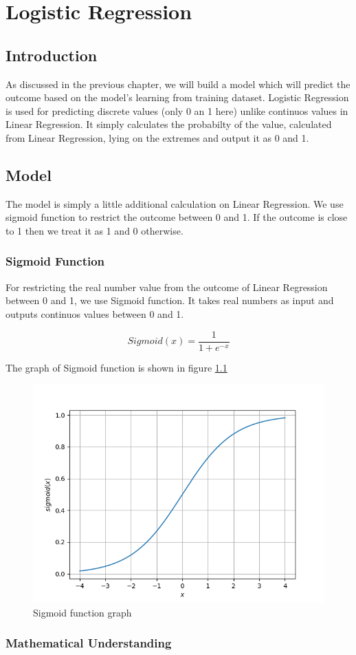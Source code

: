 
\chapter{Logistic Regression}
\label{chp:logistic}

\section{Introduction}
As discussed in the previous chapter, we will build a model which will predict
the outcome based on the model's learning from training dataset. Logistic Regression
is used for predicting discrete values (only 0 an 1 here) unlike continuos values in Linear Regression. It simply
calculates the probabilty of the value, calculated from Linear Regression, lying on the extremes and
output it as 0 and 1.

\section{Model}
The model is simply a little additional calculation on Linear Regression. We use sigmoid function
to restrict the outcome between 0 and 1. If the outcome is close to 1 then we treat it as 1 and 0 otherwise.

\subsection{Sigmoid Function}

For restricting the real number value from the outcome of Linear Regression
between 0 and 1, we use Sigmoid function. It takes real numbers as input and 
outputs continuos values between 0 and 1.

\begin{equation}
    Sigmoid(x) = \frac{1}{1+e^{-x}}
\end{equation}

The graph of Sigmoid function is shown in figure \ref{fig:sigmoid}

\begin{figure}
    \includegraphics[]{figs/sigmoid_plot.png}
    \caption{Sigmoid function graph}
    \label{fig:sigmoid}
\end{figure}

\subsection{Mathematical Understanding}